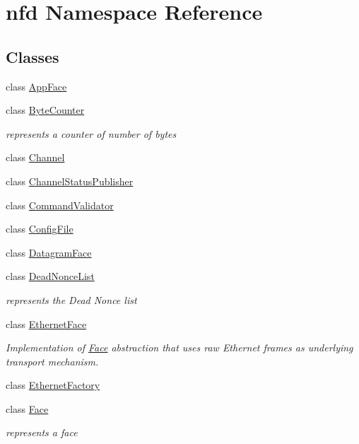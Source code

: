 \hypertarget{namespacenfd}{}\section{nfd Namespace Reference}
\label{namespacenfd}
\subsection*{Classes}
\begin{DoxyCompactItemize}
\item 
class \hyperlink{classnfd_1_1AppFace}{App\+Face}
\item 
class \hyperlink{classnfd_1_1ByteCounter}{Byte\+Counter}
\begin{DoxyCompactList}\small\item\em represents a counter of number of bytes \end{DoxyCompactList}\item 
class \hyperlink{classnfd_1_1Channel}{Channel}
\item 
class \hyperlink{classnfd_1_1ChannelStatusPublisher}{Channel\+Status\+Publisher}
\item 
class \hyperlink{classnfd_1_1CommandValidator}{Command\+Validator}
\item 
class \hyperlink{classnfd_1_1ConfigFile}{Config\+File}
\item 
class \hyperlink{classnfd_1_1DatagramFace}{Datagram\+Face}
\item 
class \hyperlink{classnfd_1_1DeadNonceList}{Dead\+Nonce\+List}
\begin{DoxyCompactList}\small\item\em represents the Dead Nonce list \end{DoxyCompactList}\item 
class \hyperlink{classnfd_1_1EthernetFace}{Ethernet\+Face}
\begin{DoxyCompactList}\small\item\em Implementation of \hyperlink{classnfd_1_1Face}{Face} abstraction that uses raw Ethernet frames as underlying transport mechanism. \end{DoxyCompactList}\item 
class \hyperlink{classnfd_1_1EthernetFactory}{Ethernet\+Factory}
\item 
class \hyperlink{classnfd_1_1Face}{Face}
\begin{DoxyCompactList}\small\item\em represents a face \end{DoxyCompactList}\item 

\end{DoxyCompactItemize}
